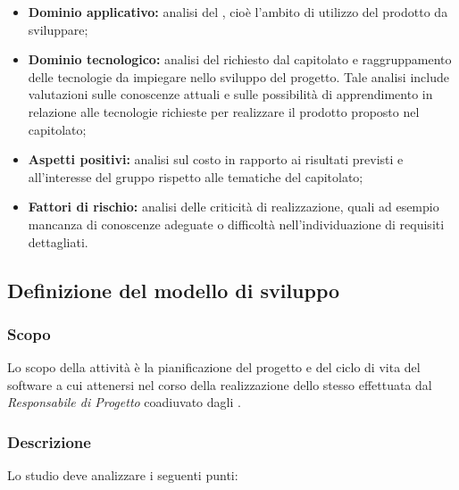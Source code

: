 \documentclass[../NormediProgetto.tex]{subfiles}
\begin{document}
\begin{itemize}
	\item \textbf{Dominio applicativo:} analisi del , cioè l'ambito di utilizzo del prodotto da sviluppare;
	
	\item \textbf{Dominio tecnologico:} analisi del  richiesto dal capitolato e raggruppamento delle tecnologie da impiegare nello sviluppo del progetto. Tale analisi include valutazioni sulle conoscenze attuali e sulle possibilità di apprendimento in relazione alle tecnologie richieste per realizzare il prodotto proposto nel capitolato;
	
	\item \textbf{Aspetti positivi:} analisi sul costo in rapporto ai risultati previsti e all’interesse del gruppo rispetto alle tematiche del capitolato;
	
	\item \textbf{Fattori di rischio:} analisi delle criticità di realizzazione, quali ad esempio mancanza di conoscenze adeguate o difficoltà nell’individuazione di requisiti dettagliati.

\end{itemize}


\subsection{Definizione del modello di sviluppo}

\subsubsection{Scopo}

Lo scopo della attività è la pianificazione del progetto e del ciclo di vita del software a cui attenersi nel corso della realizzazione dello stesso effettuata dal \textit{Responsabile di Progetto} coadiuvato dagli . 

\subsubsection{Descrizione}

Lo studio deve analizzare i seguenti punti:
\end{document}
